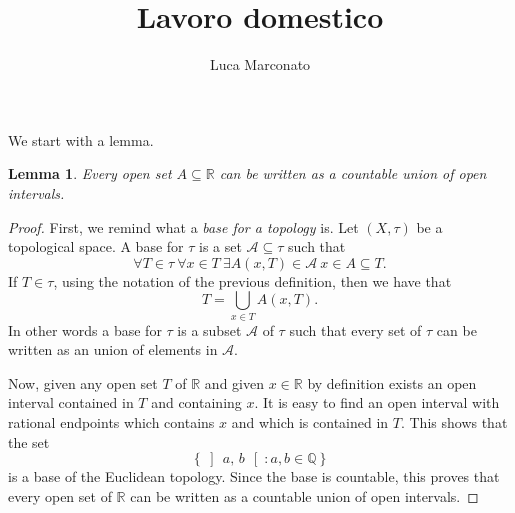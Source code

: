 \documentclass[12pt,a4paper]{article} %
\title{Lavoro domestico}
\author{Luca Marconato}
\theoremstyle{plain}
\newcommand\ioo[2]{\ensuremath{\left]\,#1,\,#2\,\right[}}
\newtheorem{lemma}[exercise]{Lemma}
\begin{document}
\maketitle
We start with a lemma.
\begin{lemma}
  Every open set $A \subseteq \mathbb{R}$ can be written as a countable union of open intervals.
\end{lemma}
\begin{proof}
  First, we remind what a \textit{base for a topology} is.
  Let $(X,\tau)$ be a topological space. 
  A base for $\tau$ is a set $\mathcal{A} \subseteq \tau$ such that
  \begin{equation*}
    \forall T \in \tau \ \forall x \in T \ \exists A(x,T) \in \mathcal{A}\ x \in A \subseteq T.
  \end{equation*}
  If $T \in \tau$, using the notation of the previous definition, then we have that
  \begin{equation*}
    T = \bigcup_{x \in T} A(x,T).
  \end{equation*}
  In other words a base for $\tau$ is a subset $\mathcal{A}$ of $\tau$ such that every set of $\tau$ can be written as an union of elements in $\mathcal{A}$.

  Now, given any open set $T$ of $\mathbb{R}$ and given $x \in \mathbb{R}$ by definition exists an open interval contained in $T$ and containing $x$.
  It is easy to find an open interval with rational endpoints which contains $x$ and which is contained in $T$.
  This shows that the set
  \begin{equation*}
    \left\lbrace \ioo{a}{b}\colon a, b \in \mathbb{Q} \right\rbrace
  \end{equation*}
  is a base of the Euclidean topology.
  Since the base is countable, this proves that every open set of $\mathbb{R}$ can be written as a countable union of open intervals.
\end{proof}
\end{document}
